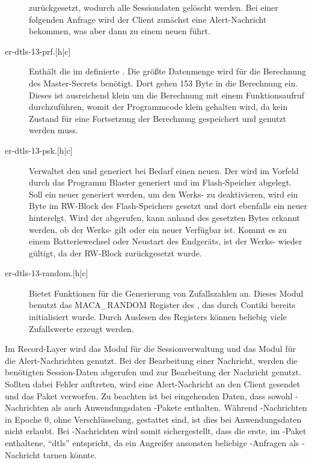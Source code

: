 \begin{description}
					zurückgesetzt, wodurch alle Sessiondaten gelöscht werden. Bei einer folgenden Anfrage wird der Client zunächst eine
					Alert-Nachricht bekommen, was aber dann zu einem neuen  führt.
  \item[er-dtls-13-prf.{$[$h|c$]$}] Enthält die im  definierte . Die größte Datenmenge wird für die Berechnung des Master-Secrets
					benötigt. Dort gehen 153 Byte in die Berechnung ein. Dieses ist ausreichend klein um die Berechnung mit einem
					Funktionsaufruf durchzuführen, womit der Programmcode klein gehalten wird, da kein Zustand für eine Fortsetzung
					der Berechnung gespeichert und genutzt werden muss.
  \item[er-dtls-13-psk.{$[$h|c$]$}] Verwaltet den  und generiert bei Bedarf einen neuen. Der  wird im Vorfeld durch das Programm Blaster
					generiert und im Flash-Speicher abgelegt. Soll ein neuer  generiert werden, um den Werks- zu deaktivieren,
					wird ein Byte im RW-Block des Flash-Speichers gesetzt und dort ebenfalls ein neuer  hinterelgt. Wird der 
					abgerufen, kann anhand des gesetzten Bytes erkannt werden, ob der Werks- gilt oder ein neuer Verfügbar ist.
					Kommt es zu einem Batteriewechsel oder Neustart des Endgeräts, ist der Werks- wieder gültigt, da der RW-Block
					zurückgesetzt wurde.
  \item[er-dtls-13-random.{$[$h|c$]$}] Bietet Funktionen für die Generierung von Zufallszahlen an. Dieses Modul benutzt das MACA\_RANDOM Register des ,
					das durch Contiki bereits initialisiert wurde. Durch Auslesen des Registers können beliebig viele Zufallswerte erzeugt werden.
\end{description}

Im Record-Layer wird das Modul für die Sessionverwaltung und das Modul für die Alert-Nachrichten genutzt. Bei der Bearbeitung einer Nachricht, werden die benötigten
Session-Daten abgerufen und zur Bearbeitung der Nachricht genutzt. Sollten dabei Fehler auftreten, wird eine Alert-Nachricht an den Client gesendet und das Paket verworfen.
Zu beachten ist bei eingehenden Daten, dass sowohl -Nachrichten als auch Anwendungsdaten -Pakete enthalten. Während -Nachrichten in
Epoche 0, ohne Verschlüsselung, gestattet sind, ist dies bei Anwendungsdaten nicht erlaubt. Bei -Nachrichten wird somit sichergestellt, dass die erste,
im -Paket enthaltene,  "`dtls"' entspricht, da ein Angreifer ansonsten beliebige -Anfragen als -Nachricht tarnen könnte.

